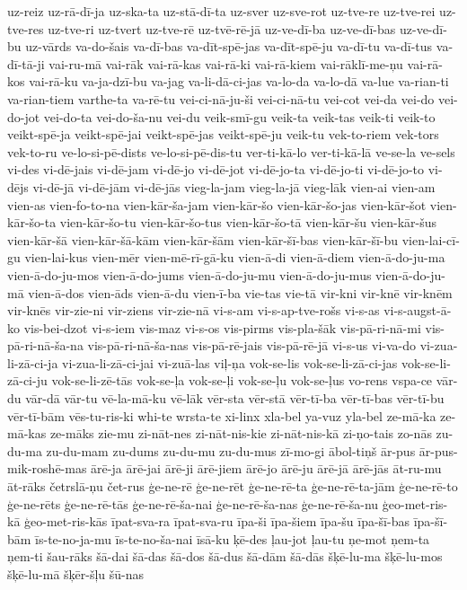 {uz-reiz
uz-rā-dī-ja
uz-ska-ta
uz-stā-dī-ta
uz-sver
uz-sve-rot
uz-tve-re
uz-tve-rei
uz-tve-res
uz-tve-ri
uz-tvert
uz-tve-rē
uz-tvē-rē-jā
uz-ve-dī-ba
uz-ve-dī-bas
uz-ve-dī-bu
uz-vārds
va-do-šais
va-dī-bas
va-dīt-spē-jas
va-dīt-spē-ju
va-dī-tu
va-dī-tus
va-dī-tā-ji
vai-ru-mā
vai-rāk
vai-rā-kas
vai-rā-ki
vai-rā-kiem
vai-rāklī-me-ņu
vai-rā-kos
vai-rā-ku
va-ja-dzī-bu
va-jag
va-li-dā-ci-jas
va-lo-da
va-lo-dā
va-lue
va-rian-ti
va-rian-tiem
varthe-ta
va-rē-tu
vei-ci-nā-ju-ši
vei-ci-nā-tu
vei-cot
vei-da
vei-do
vei-do-jot
vei-do-ta
vei-do-ša-nu
vei-du
veik-smī-gu
veik-ta
veik-tas
veik-ti
veik-to
veikt-spē-ja
veikt-spē-jai
veikt-spē-jas
veikt-spē-ju
veik-tu
vek-to-riem
vek-tors
vek-to-ru
ve-lo-si-pē-dists
ve-lo-si-pē-dis-tu
ver-ti-kā-lo
ver-ti-kā-lā
ve-se-la
ve-sels
vi-des
vi-dē-jais
vi-dē-jam
vi-dē-jo
vi-dē-jot
vi-dē-jo-ta
vi-dē-jo-ti
vi-dē-jo-to
vi-dējs
vi-dē-jā
vi-dē-jām
vi-dē-jās
vieg-la-jam
vieg-la-jā
vieg-lāk
vien-ai
vien-am
vien-as
vien-fo-to-na
vien-kār-ša-jam
vien-kār-šo
vien-kār-šo-jas
vien-kār-šot
vien-kār-šo-ta
vien-kār-šo-tu
vien-kār-šo-tus
vien-kār-šo-tā
vien-kār-šu
vien-kār-šus
vien-kār-šā
vien-kār-šā-kām
vien-kār-šām
vien-kār-šī-bas
vien-kār-šī-bu
vien-lai-cī-gu
vien-lai-kus
vien-mēr
vien-mē-rī-gā-ku
vien-ā-di
vien-ā-diem
vien-ā-do-ju-ma
vien-ā-do-ju-mos
vien-ā-do-jums
vien-ā-do-ju-mu
vien-ā-do-ju-mus
vien-ā-do-ju-mā
vien-ā-dos
vien-āds
vien-ā-du
vien-ī-ba
vie-tas
vie-tā
vir-kni
vir-knē
vir-knēm
vir-knēs
vir-zie-ni
vir-ziens
vir-zie-nā
vi-s-am
vi-s-ap-tve-rošs
vi-s-as
vi-s-augst-ā-ko
vis-bei-dzot
vi-s-iem
vis-maz
vi-s-os
vis-pirms
vis-pla-šāk
vis-pā-ri-nā-mi
vis-pā-ri-nā-ša-na
vis-pā-ri-nā-ša-nas
vis-pā-rē-jais
vis-pā-rē-jā
vi-s-us
vi-va-do
vi-zua-li-zā-ci-ja
vi-zua-li-zā-ci-jai
vi-zuā-las
viļ-ņa
vok-se-lis
vok-se-li-zā-ci-jas
vok-se-li-zā-ci-ju
vok-se-li-zē-tās
vok-se-ļa
vok-se-ļi
vok-se-ļu
vok-se-ļus
vo-rens
vspa-ce
vār-du
vār-dā
vār-tu
vē-la-mā-ku
vē-lāk
vēr-sta
vēr-stā
vēr-tī-ba
vēr-tī-bas
vēr-tī-bu
vēr-tī-bām
vēs-tu-ris-ki
whi-te
wrsta-te
xi-linx
xla-bel
ya-vuz
yla-bel
ze-mā-ka
ze-mā-kas
ze-māks
zie-mu
zi-nāt-nes
zi-nāt-nis-kie
zi-nāt-nis-kā
zi-ņo-tais
zo-nās
zu-du-ma
zu-du-mam
zu-dums
zu-du-mu
zu-du-mus
zī-mo-gi
ābol-tiņš
ār-pus
ār-pus-mik-roshē-mas
ārē-ja
ārē-jai
ārē-ji
ārē-jiem
ārē-jo
ārē-ju
ārē-jā
ārē-jās
āt-ru-mu
āt-rāks
četrslā-ņu
čet-rus
ģe-ne-rē
ģe-ne-rēt
ģe-ne-rē-ta
ģe-ne-rē-ta-jām
ģe-ne-rē-to
ģe-ne-rēts
ģe-ne-rē-tās
ģe-ne-rē-ša-nai
ģe-ne-rē-ša-nas
ģe-ne-rē-ša-nu
ģeo-met-ris-kā
ģeo-met-ris-kās
īpat-sva-ra
īpat-sva-ru
īpa-ši
īpa-šiem
īpa-šu
īpa-šī-bas
īpa-šī-bām
īs-te-no-ja-mu
īs-te-no-ša-nai
īsā-ku
ķē-des
ļau-jot
ļau-tu
ņe-mot
ņem-ta
ņem-ti
šau-rāks
šā-dai
šā-das
šā-dos
šā-dus
šā-dām
šā-dās
šķē-lu-ma
šķē-lu-mos
šķē-lu-mā
šķēr-šļu
šū-nas
}
